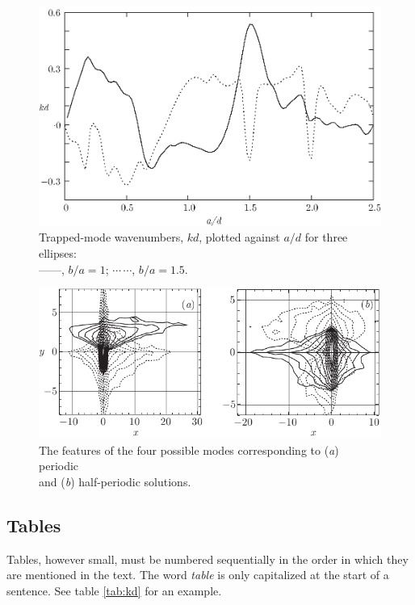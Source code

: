 \documentclass[12pt]{RBM_P}
\begin{document}
\begin{figure}
  \centering
  \includegraphics{trapped.eps}%
  \caption{Trapped-mode wavenumbers, $kd$, plotted against $a/d$ for
    three ellipses:\protect\\%
    ---$\!$---,
    $b/a=1$; $\cdots$\,$\cdots$, $b/a=1.5$.}
\label{fig:ka}
\end{figure}

\begin{figure}
  \centering
  \includegraphics{modes}
  \caption{The features of the four possible modes corresponding to
  (\textit{a}) periodic\protect\\ and (\textit{b}) half-periodic solutions.}
\label{fig:kd}
\end{figure}

\subsection{Tables}
Tables, however small, must be numbered sequentially in the order in which they are mentioned in the text. The word \textit {table} is only capitalized at the start of a sentence. See table \ref{tab:kd} for an example.
\end{document}
